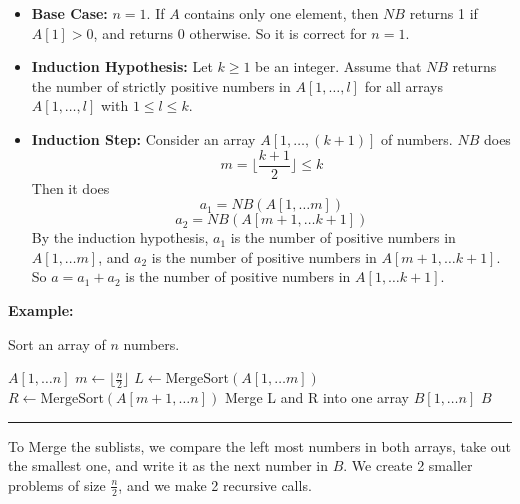 \documentclass[openany]{report}
\begin{document}
\begin{itemize}
    \item \textbf{Base Case:} $n = 1$. If $A$ contains only one element, then $NB$ returns 1 if $A[1] > 0$, and returns 0 otherwise. So it is correct for $n = 1$.
    \item \textbf{Induction Hypothesis:} Let $k \geq 1$ be an integer. Assume that $NB$ returns the number of strictly positive numbers in $A[1,\ldots,l]$ for all arrays $A[1, \ldots, l]$ with $ 1\leq l \leq k$.
    \item \textbf{Induction Step:} Consider an array $A[1,\ldots,(k+1)]$ of numbers. $NB$ does
    \[m = \lfloor \frac{k+1}{2} \rfloor \leq k\]
    Then it does 
    \[a_1 = NB(A[1, \ldots m])\]
    \[a_2 = NB(A[m+1, \ldots k+1])\]
    By the induction hypothesis, $a_1$ is the number of positive numbers in $A[1, \ldots m]$, and $a_2$ is the number of positive numbers in $A[m+1, \ldots k+1]$. So $a = a_1 + a_2$ is the number of positive numbers in $A[1, \ldots k+1]$.
\end{itemize}
\noindent
\textbf{Example:} 
\begin{algorithm}
    \caption{Sort an array of $n$ numbers.}
    \begin{algorithmic}
            \Return $A[1, \ldots n]$
        \Else
            \State $m \gets \lfloor \frac{n}{2} \rfloor$
            \State $L \gets \text{MergeSort}(A[1, \ldots m])$
            \State $R \gets \text{MergeSort}(A[m+1, \ldots n])$
            \State Merge L and R into one array $B[1, \ldots n]$
            \Return $B$
        \EndIf
        \EndProcedure
    \end{algorithmic}
    \hrule
\end{algorithm}
To Merge the sublists, we compare the left most numbers in both arrays, take out the smallest one, and write it as the next number in $B$. We create 2 smaller problems of size $\frac{n}{2}$, and we make 2 recursive calls.

\end{document}
